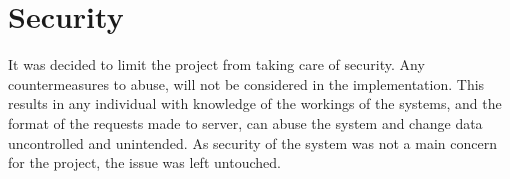 \section{Security}

It was decided to limit the project from taking care of security. Any countermeasures to abuse, will not be considered in the implementation. This results in any individual with knowledge of the workings of the systems, and the format of the requests made to server, can abuse the system and change data uncontrolled and unintended. As security of the system was not a main concern for the project, the issue was left untouched.